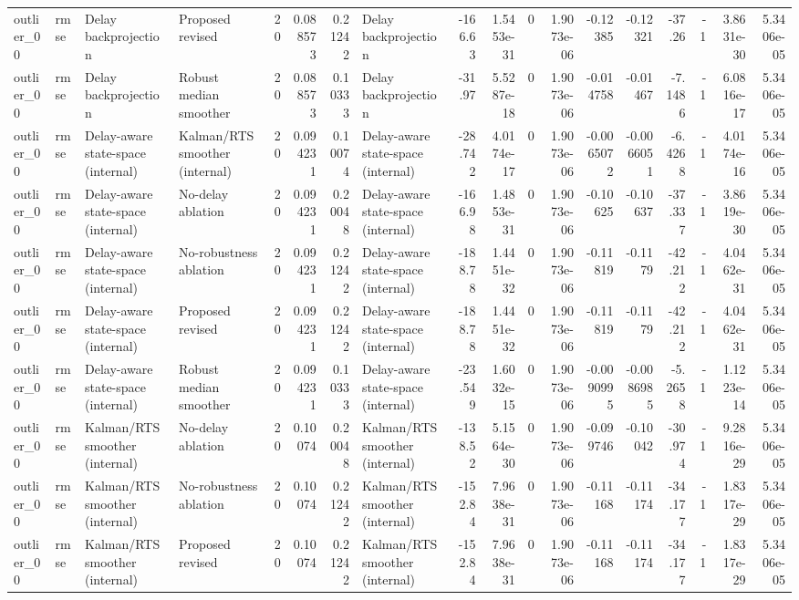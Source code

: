 \begin{table}[!htbp]
{\begin{tabular}{llllrrrlrrrrrrrrrr}
outlier_00 & rmse & Delay backprojection & Proposed revised & 20 & 0.088573 & 0.21242 & Delay backprojection & -166.63 & 1.5453e-31 & 0 & 1.9073e-06 & -0.12385 & -0.12321 & -37.26 & -1 & 3.8631e-30 & 5.3406e-05 \\
outlier_00 & rmse & Delay backprojection & Robust median smoother & 20 & 0.088573 & 0.10333 & Delay backprojection & -31.97 & 5.5287e-18 & 0 & 1.9073e-06 & -0.014758 & -0.01467 & -7.1486 & -1 & 6.0816e-17 & 5.3406e-05 \\
outlier_00 & rmse & Delay-aware state-space (internal) & Kalman/RTS smoother (internal) & 20 & 0.094231 & 0.10074 & Delay-aware state-space (internal) & -28.742 & 4.0174e-17 & 0 & 1.9073e-06 & -0.0065072 & -0.0066051 & -6.4268 & -1 & 4.0174e-16 & 5.3406e-05 \\
outlier_00 & rmse & Delay-aware state-space (internal) & No-delay ablation & 20 & 0.094231 & 0.20048 & Delay-aware state-space (internal) & -166.98 & 1.4853e-31 & 0 & 1.9073e-06 & -0.10625 & -0.10637 & -37.337 & -1 & 3.8619e-30 & 5.3406e-05 \\
outlier_00 & rmse & Delay-aware state-space (internal) & No-robustness ablation & 20 & 0.094231 & 0.21242 & Delay-aware state-space (internal) & -188.78 & 1.4451e-32 & 0 & 1.9073e-06 & -0.11819 & -0.1179 & -42.212 & -1 & 4.0462e-31 & 5.3406e-05 \\
outlier_00 & rmse & Delay-aware state-space (internal) & Proposed revised & 20 & 0.094231 & 0.21242 & Delay-aware state-space (internal) & -188.78 & 1.4451e-32 & 0 & 1.9073e-06 & -0.11819 & -0.1179 & -42.212 & -1 & 4.0462e-31 & 5.3406e-05 \\
outlier_00 & rmse & Delay-aware state-space (internal) & Robust median smoother & 20 & 0.094231 & 0.10333 & Delay-aware state-space (internal) & -23.549 & 1.6032e-15 & 0 & 1.9073e-06 & -0.0090995 & -0.0086985 & -5.2658 & -1 & 1.1223e-14 & 5.3406e-05 \\
outlier_00 & rmse & Kalman/RTS smoother (internal) & No-delay ablation & 20 & 0.10074 & 0.20048 & Kalman/RTS smoother (internal) & -138.52 & 5.1564e-30 & 0 & 1.9073e-06 & -0.099746 & -0.10042 & -30.974 & -1 & 9.2816e-29 & 5.3406e-05 \\
outlier_00 & rmse & Kalman/RTS smoother (internal) & No-robustness ablation & 20 & 0.10074 & 0.21242 & Kalman/RTS smoother (internal) & -152.84 & 7.9638e-31 & 0 & 1.9073e-06 & -0.11168 & -0.11174 & -34.177 & -1 & 1.8317e-29 & 5.3406e-05 \\
outlier_00 & rmse & Kalman/RTS smoother (internal) & Proposed revised & 20 & 0.10074 & 0.21242 & Kalman/RTS smoother (internal) & -152.84 & 7.9638e-31 & 0 & 1.9073e-06 & -0.11168 & -0.11174 & -34.177 & -1 & 1.8317e-29 & 5.3406e-05 \\

\end{tabular}}
\end{table}
